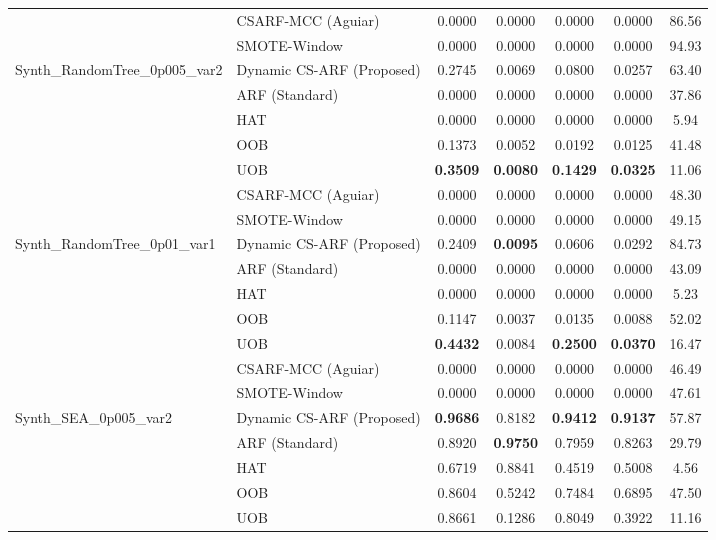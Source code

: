 \begin{longtable}{|l|l|c|c|c|c|c|}
 & CSARF-MCC (Aguiar) & 0.0000 & 0.0000 & 0.0000 & 0.0000 & 86.56 \\ \cline{2-7}
 & SMOTE-Window & 0.0000 & 0.0000 & 0.0000 & 0.0000 & 94.93 \\ \hline
\multirow{7}{*}{Synth_RandomTree_0p005_var2} & Dynamic CS-ARF (Proposed) & 0.2745 & 0.0069 & 0.0800 & 0.0257 & 63.40 \\ \cline{2-7}
 & ARF (Standard) & 0.0000 & 0.0000 & 0.0000 & 0.0000 & 37.86 \\ \cline{2-7}
 & HAT & 0.0000 & 0.0000 & 0.0000 & 0.0000 & 5.94 \\ \cline{2-7}
 & OOB & 0.1373 & 0.0052 & 0.0192 & 0.0125 & 41.48 \\ \cline{2-7}
 & UOB & \textbf{0.3509} & \textbf{0.0080} & \textbf{0.1429} & \textbf{0.0325} & 11.06 \\ \cline{2-7}
 & CSARF-MCC (Aguiar) & 0.0000 & 0.0000 & 0.0000 & 0.0000 & 48.30 \\ \cline{2-7}
 & SMOTE-Window & 0.0000 & 0.0000 & 0.0000 & 0.0000 & 49.15 \\ \hline
\multirow{7}{*}{Synth_RandomTree_0p01_var1} & Dynamic CS-ARF (Proposed) & 0.2409 & \textbf{0.0095} & 0.0606 & 0.0292 & 84.73 \\ \cline{2-7}
 & ARF (Standard) & 0.0000 & 0.0000 & 0.0000 & 0.0000 & 43.09 \\ \cline{2-7}
 & HAT & 0.0000 & 0.0000 & 0.0000 & 0.0000 & 5.23 \\ \cline{2-7}
 & OOB & 0.1147 & 0.0037 & 0.0135 & 0.0088 & 52.02 \\ \cline{2-7}
 & UOB & \textbf{0.4432} & 0.0084 & \textbf{0.2500} & \textbf{0.0370} & 16.47 \\ \cline{2-7}
 & CSARF-MCC (Aguiar) & 0.0000 & 0.0000 & 0.0000 & 0.0000 & 46.49 \\ \cline{2-7}
 & SMOTE-Window & 0.0000 & 0.0000 & 0.0000 & 0.0000 & 47.61 \\ \hline
\multirow{7}{*}{Synth_SEA_0p005_var2} & Dynamic CS-ARF (Proposed) & \textbf{0.9686} & 0.8182 & \textbf{0.9412} & \textbf{0.9137} & 57.87 \\ \cline{2-7}
 & ARF (Standard) & 0.8920 & \textbf{0.9750} & 0.7959 & 0.8263 & 29.79 \\ \cline{2-7}
 & HAT & 0.6719 & 0.8841 & 0.4519 & 0.5008 & 4.56 \\ \cline{2-7}
 & OOB & 0.8604 & 0.5242 & 0.7484 & 0.6895 & 47.50 \\ \cline{2-7}
 & UOB & 0.8661 & 0.1286 & 0.8049 & 0.3922 & 11.16 \\ \cline{2-7}

\end{longtable}
